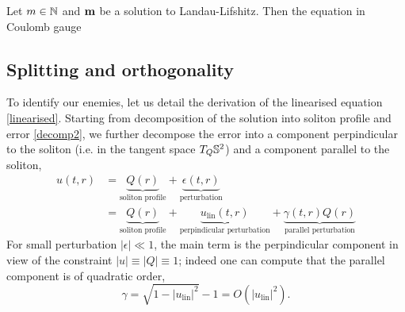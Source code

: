 \begin{proposition}
    Let $m \in \mathbb N$ and ${\bf m}$ be a solution to Landau-Lifshitz. Then the equation in Coulomb gauge     
\end{proposition}


\subsection{Splitting and orthogonality}

To identify our enemies, let us detail the derivation of the linearised equation \eqref{linearised}. Starting from decomposition of the solution into soliton profile and error \eqref{decomp2}, we further decompose the error into a component perpindicular to the soliton (i.e. in the tangent space $T_Q \mathbb S^2$) and a component parallel to the soliton,
    \begin{equation}
        \begin{split}
            u(t, r) 
                &=  \underbrace{Q(r)}_{\text{soliton profile}} + \underbrace{\epsilon(t, r)}_{\text{perturbation}} \\
                &= \underbrace{Q(r)}_{\text{soliton profile}} + \underbrace{u_{\mathrm{lin}} (t, r)}_{\text{perpindicular perturbation}} + \underbrace{\gamma(t, r) Q(r)}_{\text{parallel perturbation}}
        \end{split}
    \end{equation}
For small perturbation $|\epsilon| \ll 1$, the main term is the perpindicular component in view of the constraint $|u| \equiv |Q| \equiv 1$; indeed one can compute that the parallel component is of quadratic order, 
    \[
        \gamma = \sqrt{1 - |u_{\mathrm{lin}}|^2} - 1 = O(|u_{\mathrm{lin}}|^2). 
    \]


